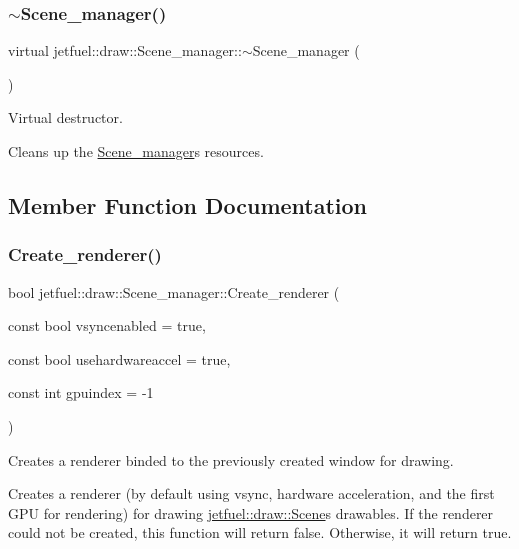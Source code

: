 \subsubsection{\texorpdfstring{$\sim$\+Scene\+\_\+manager()}{~Scene\_manager()}}
{\footnotesize\ttfamily virtual jetfuel\+::draw\+::\+Scene\+\_\+manager\+::$\sim$\+Scene\+\_\+manager (\begin{DoxyParamCaption}{ }\end{DoxyParamCaption})\hspace{0.3cm}{\ttfamily [virtual]}}



Virtual destructor. 

Cleans up the \hyperlink{classjetfuel_1_1draw_1_1Scene__manager}{Scene\+\_\+manager}\textquotesingle{}s resources. 

\subsection{Member Function Documentation}
\mbox{\label{classjetfuel_1_1draw_1_1Scene__manager_afafecd926ce5e4b2543a6d583a7d24b6}} 
\subsubsection{\texorpdfstring{Create\+\_\+renderer()}{Create\_renderer()}}
{\footnotesize\ttfamily bool jetfuel\+::draw\+::\+Scene\+\_\+manager\+::\+Create\+\_\+renderer (\begin{DoxyParamCaption}\item[{const bool}]{vsyncenabled = {\ttfamily true},  }\item[{const bool}]{usehardwareaccel = {\ttfamily true},  }\item[{const int}]{gpuindex = {\ttfamily -\/1} }\end{DoxyParamCaption})}



Creates a renderer binded to the previously created window for drawing. 

Creates a renderer (by default using vsync, hardware acceleration, and the first G\+PU for rendering) for drawing \hyperlink{classjetfuel_1_1draw_1_1Scene}{jetfuel\+::draw\+::\+Scene}\textquotesingle{}s drawables. If the renderer could not be created, this function will return false. Otherwise, it will return true.


